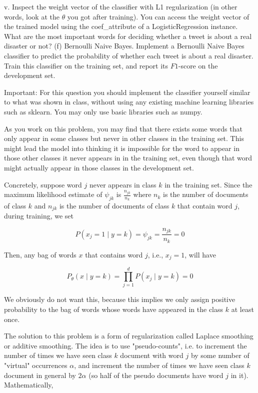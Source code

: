 \documentclass[10pt]{article}
\begin{document}
v. Inspect the weight vector of the classifier with L1 regularization (in other words, look at the $\theta$ you got after training). You can access the weight vector of the trained model using the coef\_attribute of a LogisticRegression instance. What are the most important words for deciding whether a tweet is about a real disaster or not? (f) Bernoulli Naive Bayes. Implement a Bernoulli Naive Bayes classifier to predict the probability of whether each tweet is about a real disaster. Train this classifier on the training set, and report its $F 1$-score on the development set.

Important: For this question you should implement the classifier yourself similar to what was shown in class, without using any existing machine learning libraries such as sklearn. You may only use basic libraries such as numpy.

As you work on this problem, you may find that there exists some words that only appear in some classes but never in other classes in the training set. This might lead the model into thinking it is impossible for the word to appear in those other classes it never appears in in the training set, even though that word might actually appear in those classes in the development set.

Concretely, suppose word $j$ never appears in class $k$ in the training set. Since the maximum likelihood estimate of $\psi_{j k}$ is $\frac{n_{j k}}{n_{k}}$ where $n_{k}$ is the number of documents of class $k$ and $n_{j k}$ is the number of documents of class $k$ that contain word $j$, during training, we set

$$
P\left(x_{j}=1 \mid y=k\right)=\psi_{j k}=\frac{n_{j k}}{n_{k}}=0
$$

Then, any bag of words $x$ that contains word $j$, i.e., $x_{j}=1$, will have

$$
P_{\theta}(x \mid y=k)=\prod_{j=1}^{d} P\left(x_{j} \mid y=k\right)=0
$$

We obviously do not want this, because this implies we only assign positive probability to the bag of words whose words have appeared in the class $k$ at least once.

The solution to this problem is a form of regularization called Laplace smoothing or additive smoothing. The idea is to use "pseudo-counts", i.e. to increment the number of times we have seen class $k$ document with word $j$ by some number of "virtual" occurrences $\alpha$, and increment the number of times we have seen class $k$ document in general by $2 \alpha$ (so half of the pseudo documents have word $j$ in it). Mathematically,
\end{document}
